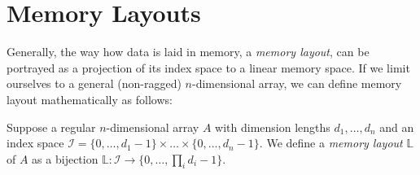 \section{Memory Layouts}





Generally, the way how data is laid in memory, a \emph{memory layout}, can be portrayed as a projection of its index space to a linear memory space. If we limit ourselves to a general (non-ragged) $n$-dimensional array, we can define memory layout mathematically as follows:

\begin{defn}
  Suppose a regular $n$-dimensional array $A$ with dimension lengths $d_1, \dots, d_n$ and an index space $\mathcal{I} = \{0,\dots,d_1 - 1\}\times \dots \times \{0,\dots,d_n - 1\}$. We define a \emph{memory layout} $\mathbb{L}$ of $A$ as a bijection $\mathbb{L}: \mathcal{I} \to \{0,\dots, \prod_{i}d_i - 1\}$. 
\end{defn}

